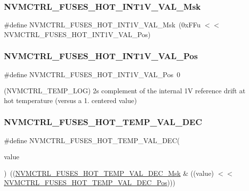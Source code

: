 \subsubsection{\texorpdfstring{NVMCTRL\_FUSES\_HOT\_INT1V\_VAL\_Msk}{NVMCTRL\_FUSES\_HOT\_INT1V\_VAL\_Msk}}
{\footnotesize\ttfamily \#define N\+V\+M\+C\+T\+R\+L\+\_\+\+F\+U\+S\+E\+S\+\_\+\+H\+O\+T\+\_\+\+I\+N\+T1\+V\+\_\+\+V\+A\+L\+\_\+\+Msk~(0x\+F\+Fu $<$$<$ N\+V\+M\+C\+T\+R\+L\+\_\+\+F\+U\+S\+E\+S\+\_\+\+H\+O\+T\+\_\+\+I\+N\+T1\+V\+\_\+\+V\+A\+L\+\_\+\+Pos)}

\mbox{\label{group__fuses__api_gad1b7b3b85a3a761b154b59975f5de897}} 
\subsubsection{\texorpdfstring{NVMCTRL\_FUSES\_HOT\_INT1V\_VAL\_Pos}{NVMCTRL\_FUSES\_HOT\_INT1V\_VAL\_Pos}}
{\footnotesize\ttfamily \#define N\+V\+M\+C\+T\+R\+L\+\_\+\+F\+U\+S\+E\+S\+\_\+\+H\+O\+T\+\_\+\+I\+N\+T1\+V\+\_\+\+V\+A\+L\+\_\+\+Pos~0}



(N\+V\+M\+C\+T\+R\+L\+\_\+\+T\+E\+M\+P\+\_\+\+L\+OG) 2\textquotesingle{}s complement of the internal 1V reference drift at hot temperature (versus a 1. centered value) 

\mbox{\label{group__fuses__api_ga117d4dfd8a1a03957376cddfae9ed5f3}} 
\subsubsection{\texorpdfstring{NVMCTRL\_FUSES\_HOT\_TEMP\_VAL\_DEC}{NVMCTRL\_FUSES\_HOT\_TEMP\_VAL\_DEC}}
{\footnotesize\ttfamily \#define N\+V\+M\+C\+T\+R\+L\+\_\+\+F\+U\+S\+E\+S\+\_\+\+H\+O\+T\+\_\+\+T\+E\+M\+P\+\_\+\+V\+A\+L\+\_\+\+D\+EC(\begin{DoxyParamCaption}\item[{}]{value }\end{DoxyParamCaption})~((\mbox{\hyperlink{group__fuses__api_ga9590f44c54507db098841324ba8162e5}{N\+V\+M\+C\+T\+R\+L\+\_\+\+F\+U\+S\+E\+S\+\_\+\+H\+O\+T\+\_\+\+T\+E\+M\+P\+\_\+\+V\+A\+L\+\_\+\+D\+E\+C\+\_\+\+Msk}} \& ((value) $<$$<$ \mbox{\hyperlink{group__fuses__api_ga5dd188f426f80a6ad1f51c4815482ae6}{N\+V\+M\+C\+T\+R\+L\+\_\+\+F\+U\+S\+E\+S\+\_\+\+H\+O\+T\+\_\+\+T\+E\+M\+P\+\_\+\+V\+A\+L\+\_\+\+D\+E\+C\+\_\+\+Pos}})))}

